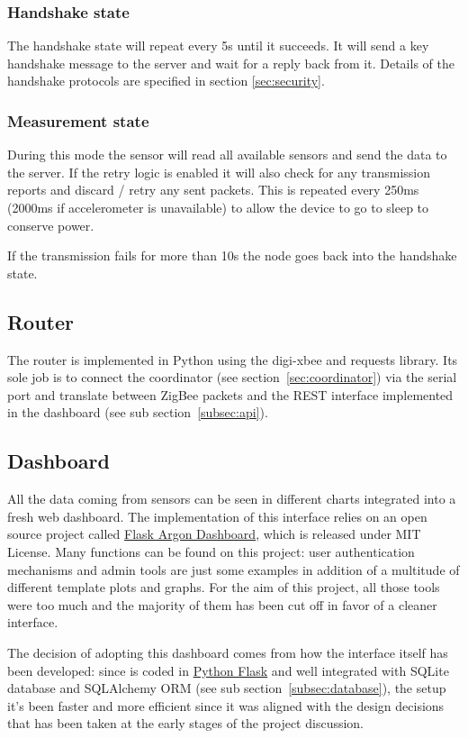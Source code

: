 \documentclass[a4paper,11pt]{scrartcl}
\begin{document}
\subsubsection*{Handshake state}
The handshake state will repeat every 5s until it succeeds. It will send a key handshake message to the server and wait for a reply back from it. Details of the handshake protocols are specified in section \ref{sec:security}.

\subsubsection*{Measurement state}
During this mode the sensor will read all available sensors and send the data to the server. If the retry logic is enabled it will also check for any transmission reports and discard / retry any sent packets. This is repeated every 250ms (2000ms if accelerometer is unavailable) to allow the device to go to sleep to conserve power.

If the transmission fails for more than 10s the node goes back into the handshake state.

\subsection{Router}\label{subsec:router}
The router is implemented in Python using the digi-xbee and requests library. Its sole job is to connect the coordinator (see section~\ref{sec:coordinator}) via the serial port and translate between ZigBee packets and the REST interface implemented in the dashboard (see sub section~\ref{subsec:api}).

\subsection{Dashboard}
All the data coming from sensors can be seen in different charts integrated into a fresh web dashboard. The implementation of this interface relies on an open source project called \href{https://github.com/app-generator/flask-argon-dashboard}{Flask Argon Dashboard}, which is released under MIT License. Many functions can be found on this project: user authentication mechanisms and admin tools are just some examples in addition of a multitude of different template plots and graphs. For the aim of this project, all those tools were too much and the majority of them has been cut off in favor of a cleaner interface.

The decision of adopting this dashboard comes from how the interface itself has been developed: since is coded in \href{https://palletsprojects.com/p/flask/}{Python Flask} and well integrated with SQLite database and SQLAlchemy ORM (see sub section~\ref{subsec:database}), the setup it's been faster and more efficient since it was aligned with the design decisions that has been taken at the early stages of the project discussion.
\end{document}
